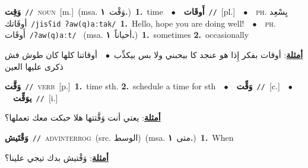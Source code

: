 \documentclass[10pt,a4paper,twoside]{article} %
\begin{document}
\begin{multicols}{2}
{\setlength\topsep{0pt}\textbf{\foreignlanguage{arabic}{وَقِت}}\ {\color{gray}\texttt{//}\color{black}}\ \textsc{noun}\ [m.]\ \color{gray}(msa. \foreignlanguage{arabic}{وَقْت}~\foreignlanguage{arabic}{\textbf{١.}})\color{black}\ \textbf{1.}~time\ \ $\bullet$\ \ \setlength\topsep{0pt}\textbf{\foreignlanguage{arabic}{أَوقَات}}\ {\color{gray}\texttt{//}\color{black}}\ [pl.]\ \ $\bullet$\ \ \textsc{ph.} \color{gray} \foreignlanguage{arabic}{يِسْعِد أوقَاتك}\color{black}\ {\color{gray}\texttt{/{\sffamily jisʕid ʔaw(q)aːtak}/}\color{black}}\ \textbf{1.}~Hello, hope you are doing well!\ \ $\bullet$\ \ \textsc{ph.} \color{gray} \foreignlanguage{arabic}{أَوقَات}\color{black}\ {\color{gray}\texttt{/{\sffamily ʔaw(q)aːt}/}\color{black}}\ \color{gray} (msa. \foreignlanguage{arabic}{أحياناً}~\foreignlanguage{arabic}{\textbf{١.}})\color{black}\ \textbf{1.}~sometimes  \textbf{2.}~occasionally\  \begin{flushright}\color{gray}\foreignlanguage{arabic}{\textbf{\underline{\foreignlanguage{arabic}{أمثلة}}}: أوقات بفكر إِذا هو عنجد كا بيحبني ولا بس بيكذِّب\ $\bullet$\ \  أوقاتنا كلها كان طوش فش ذكرى عليها العين}\end{flushright}\color{black}} \vspace{2mm}

{\setlength\topsep{0pt}\textbf{\foreignlanguage{arabic}{وَقَّت}}\ {\color{gray}\texttt{//}\color{black}}\ \textsc{verb}\ [p.]\ \textbf{1.}~time sth.  \textbf{2.}~schedule a time for sth\ \ $\bullet$\ \ \setlength\topsep{0pt}\textbf{\foreignlanguage{arabic}{وَقِّت}}\ {\color{gray}\texttt{//}\color{black}}\ [c.]\ \ $\bullet$\ \ \setlength\topsep{0pt}\textbf{\foreignlanguage{arabic}{يوَقِّت}}\ {\color{gray}\texttt{//}\color{black}}\ [i.]\  \begin{flushright}\color{gray}\foreignlanguage{arabic}{\textbf{\underline{\foreignlanguage{arabic}{أمثلة}}}: يعتي أنت وَقَّتتها هلا حبكت معك تعملها؟}\end{flushright}\color{black}} \vspace{2mm}

{\setlength\topsep{0pt}\textbf{\foreignlanguage{arabic}{وَقْتَيش}}\ {\color{gray}\texttt{//}\color{black}}\ \textsc{adv\textunderscore interrog}\ (src. \color{gray}\foreignlanguage{arabic}{الوسط}\color{black})\ \color{gray}(msa. \foreignlanguage{arabic}{متى}~\foreignlanguage{arabic}{\textbf{١.}})\color{black}\ \textbf{1.}~When\  \begin{flushright}\color{gray}\foreignlanguage{arabic}{\textbf{\underline{\foreignlanguage{arabic}{أمثلة}}}: وَقْتيش بدك تيجي علينا؟}\end{flushright}\color{black}} \vspace{2mm}


\end{multicols}
\end{document}
